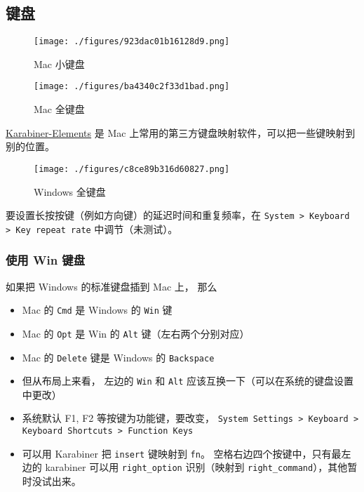 
\subsection{键盘}

\begin{figure}[ht]
\centering
\texttt{[image: ./figures/923dac01b16128d9.png]}
\caption{Mac 小键盘} \label{fig_MacNt_5}
\end{figure}


\begin{figure}[ht]
\centering
\texttt{[image: ./figures/ba4340c2f33d1bad.png]}
\caption{Mac 全键盘} \label{fig_MacNt_4}
\end{figure}

\href{https://karabiner-elements.pqrs.org/}{Karabiner-Elements} 是 Mac 上常用的第三方键盘映射软件，可以把一些键映射到别的位置。

\begin{figure}[ht]
\centering
\texttt{[image: ./figures/c8ce89b316d60827.png]}
\caption{Windows 全键盘} \label{fig_MacNt_3}
\end{figure}

要设置长按按键（例如方向键）的延迟时间和重复频率，在 \verb`System > Keyboard > Key repeat rate` 中调节（未测试）。

\subsubsection{使用 Win 键盘}
如果把 Windows 的标准键盘插到 Mac 上， 那么
\begin{itemize}
\item Mac 的 \verb`Cmd` 是 Windows 的 \verb`Win` 键
\item Mac 的 \verb`Opt` 是 Win 的 \verb`Alt` 键（左右两个分别对应）
\item Mac 的 \verb`Delete` 键是 Windows 的 \verb`Backspace`
\item 但从布局上来看， 左边的 \verb`Win` 和 \verb`Alt` 应该互换一下（可以在系统的键盘设置中更改）
\item 系统默认 F1, F2 等按键为功能键，要改变， \verb`System Settings > Keyboard > Keyboard Shortcuts > Function Keys`
\item 可以用 Karabiner 把 \verb`insert` 键映射到 \verb`fn`。 空格右边四个按键中，只有最左边的 karabiner 可以用 \verb`right_option` 识别（映射到 \verb`right_command`），其他暂时没试出来。
\end{itemize}

